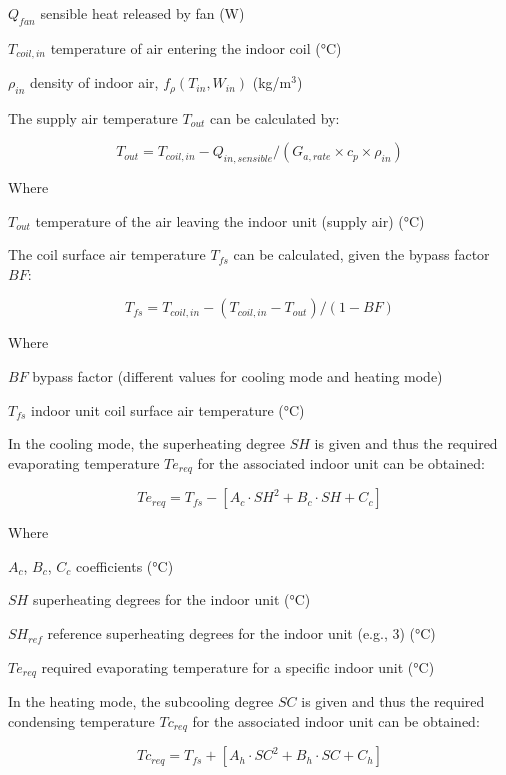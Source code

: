 $Q_{fan}$	sensible heat released by fan (W)

$T_{coil,in}$	temperature of air entering the indoor coil (°C)

$\rho_{in}$	density of indoor air, $f_{\rho}(T_{in},W_{in})$  (kg/m\(^3\))

The supply air temperature $T_{out}$ can be calculated by:

\begin{equation}
  T_{out} = T_{coil,in} - Q_{in, sensible} / (G_{a,rate}\times{c_p}\times\rho_{in})
\end{equation}

Where

$T_{out}$	temperature of the air leaving the indoor unit (supply air) (°C)

The coil surface air temperature $T_{fs}$ can be calculated, given the bypass factor $BF$:

\begin{equation}
  T_{fs}= T_{coil,in} - (T_{coil,in}-T_{out}) / (1-BF)
\end{equation}

Where

$BF$ bypass factor (different values for cooling mode and heating mode) 

$T_{fs}$ indoor unit coil surface air temperature (°C)

In the cooling mode, the superheating degree $SH$ is given and thus the required evaporating temperature $Te_{req}$ for the associated indoor unit can be obtained:

\begin{equation}
  Te_{req}=T_{fs}-[A_c\cdot SH^2+B_c\cdot SH+C_c]
\end{equation}
 
Where

$A_c$, $B_c$, $C_c$ coefficients (°C)

$SH$ superheating degrees for the indoor unit (°C) 

$SH_{ref}$ reference superheating degrees for the indoor unit (e.g., 3) (°C)

$Te_{req}$ required evaporating temperature for a specific indoor unit (°C)

In the heating mode, the subcooling degree $SC$ is given and thus the required condensing temperature $Tc_{req}$ for the associated indoor unit can be obtained:

\begin{equation}
  Tc_{req}=T_{fs}+[A_h\cdot SC^2+B_h\cdot SC+C_h]
\end{equation}
 
